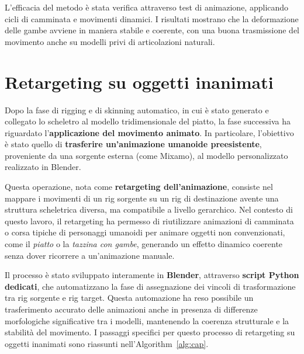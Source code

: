L'efficacia del metodo è stata verifica attraverso test di animazione, applicando cicli di camminata e movimenti dinamici. I risultati mostrano che la deformazione delle gambe avviene in maniera stabile e coerente, con una buona trasmissione del movimento anche su modelli privi di articolazioni naturali.



\section{Retargeting su oggetti inanimati}

Dopo la fase di rigging e di skinning automatico, in cui è stato generato e collegato lo scheletro al modello tridimensionale del piatto, la fase successiva ha riguardato l'\textbf{applicazione del movimento animato}.
In particolare, l'obiettivo è stato quello di \textbf{trasferire un'animazione umanoide preesistente}, proveniente da una sorgente esterna (come Mixamo), al modello personalizzato realizzato in Blender.

Questa operazione, nota come \textbf{retargeting dell'animazione}, consiste nel mappare i movimenti di un rig sorgente su un rig di destinazione avente una struttura scheletrica diversa, ma compatibile a livello gerarchico.
Nel contesto di questo lavoro, il retargeting ha permesso di riutilizzare animazioni di camminata o corsa tipiche di personaggi umanoidi per animare oggetti non convenzionati, come il \textit{piatto} o la \textit{tazzina con gambe}, generando un effetto dinamico coerente senza dover ricorrere a un'animazione manuale.

Il processo è stato sviluppato interamente in \textbf{Blender}, attraverso \textbf{script Python dedicati}, che automatizzano la fase di assegnazione dei vincoli di trasformazione tra rig sorgente e rig target. Questa automazione ha reso possibile un trasferimento accurato delle animazioni anche in presenza di differenze morfologiche significative tra i modelli, mantenendo la coerenza strutturale e la stabilità del movimento. I passaggi specifici per questo processo di retargeting su oggetti inanimati sono riassunti nell'Algorithm~\ref{alg:cap}.

\vspace{5mm}
\begin{minipage}{1\linewidth}
\begin{algorithm}[H]
\caption{RetargetAnimation} \label{alg:cap}
\end{algorithm}
\end{minipage}


